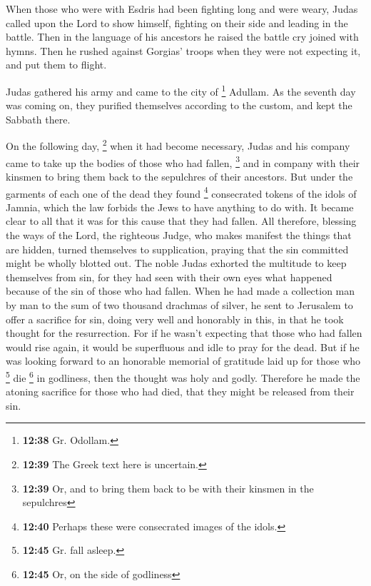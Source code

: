  When those who were with Esdris had been fighting long
and were weary, Judas called upon the Lord to show himself, fighting on
their side and leading in the battle.  Then in the
language of his ancestors he raised the battle cry joined with hymns.
Then he rushed against Gorgias' troops when they were not expecting it,
and put them to flight.

 Judas gathered his army and came to the city of
\footnote{\textbf{12:38} Gr. Odollam.} Adullam. As the seventh day was
coming on, they purified themselves according to the custom, and kept
the Sabbath there.

 On the following day, \footnote{\textbf{12:39} The Greek
  text here is uncertain.} when it had become necessary, Judas and his
company came to take up the bodies of those who had fallen, \footnote{\textbf{12:39}
  Or, and to bring them back to be with their kinsmen in the sepulchres}
and in company with their kinsmen to bring them back to the sepulchres
of their ancestors.  But under the garments of each one
of the dead they found \footnote{\textbf{12:40} Perhaps these were
  consecrated images of the idols.} consecrated tokens of the idols of
Jamnia, which the law forbids the Jews to have anything to do with. It
became clear to all that it was for this cause that they had fallen.
 All therefore, blessing the ways of the Lord, the
righteous Judge, who makes manifest the things that are hidden,
 turned themselves to supplication, praying that the sin
committed might be wholly blotted out. The noble Judas exhorted the
multitude to keep themselves from sin, for they had seen with their own
eyes what happened because of the sin of those who had fallen.
 When he had made a collection man by man to the sum of
two thousand drachmas of silver, he sent to Jerusalem to offer a
sacrifice for sin, doing very well and honorably in this, in that he
took thought for the resurrection.  For if he wasn't
expecting that those who had fallen would rise again, it would be
superfluous and idle to pray for the dead.  But if he was
looking forward to an honorable memorial of gratitude laid up for those
who \footnote{\textbf{12:45} Gr. fall asleep.} die \footnote{\textbf{12:45}
  Or, on the side of godliness} in godliness, then the thought was holy
and godly. Therefore he made the atoning sacrifice for those who had
died, that they might be released from their sin.

